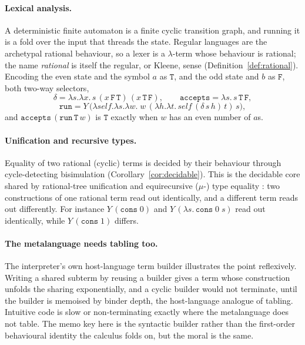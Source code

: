 \paragraph{Lexical analysis.}
A deterministic finite automaton is a finite cyclic transition graph, and running it is a fold over
the input that threads the state. Regular languages are the archetypal rational behaviour, so a lexer
is a $\lambda$-term whose behaviour is rational; the name \emph{rational} is itself the regular, or
Kleene, sense (Definition~\ref{def:rational}). Encoding the even state and the symbol $a$ as
$\mathtt{T}$, and the odd state and $b$ as $\mathtt{F}$, both two-way selectors,
\[
  \delta = \lambda s.\lambda x.\,s\,(x\,\mathtt{F}\,\mathtt{T})\,(x\,\mathtt{T}\,\mathtt{F}), \qquad
  \mathtt{accepts} = \lambda s.\,s\,\mathtt{T}\,\mathtt{F},
\]
\[
  \mathtt{run} = Y\,\big(\lambda\mathit{self}.\lambda s.\lambda w.\;
  w\,(\lambda h.\lambda t.\,\mathit{self}\,(\delta\,s\,h)\,t)\,s\big),
\]
and $\mathtt{accepts}\,(\mathtt{run}\,\mathtt{T}\,w)$ is $\mathtt{T}$ exactly when $w$ has an even
number of $a$s.

\paragraph{Unification and recursive types.}
Equality of two rational (cyclic) terms is decided by their behaviour through cycle-detecting
bisimulation (Corollary~\ref{cor:decidable}). This is the decidable core shared by rational-tree
unification  and equirecursive ($\mu$-) type equality
: two constructions of one rational term read out
identically, and a different term reads out differently. For instance $Y\,(\mathtt{cons}\;0)$ and
$Y\,(\lambda s.\,\mathtt{cons}\;0\;s)$ read out identically, while $Y\,(\mathtt{cons}\;1)$ differs.

\paragraph{The metalanguage needs tabling too.}
The interpreter's own host-language term builder illustrates the point reflexively. Writing a shared
subterm by reusing a builder gives a term whose construction unfolds the sharing exponentially, and
a cyclic builder would not terminate, until the builder is memoised by binder depth, the
host-language analogue of tabling. Intuitive code is slow or non-terminating exactly where the
metalanguage does not table. The memo key here is the syntactic builder rather than the first-order
behavioural identity the calculus folds on, but the moral is the same.

